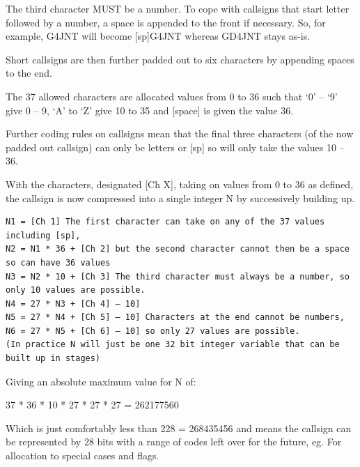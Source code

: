 The third character MUST be a number. To cope with callsigns that start
letter followed by a number, a space is appended to the front if
necessary. So, for example, G4JNT will become {[}sp{]}G4JNT whereas
GD4JNT stays as-is.

Short callsigns are then further padded out to six characters by
appending spaces to the end.

The 37 allowed characters are allocated values from 0 to 36 such that
`0' -- `9' give 0 -- 9, `A' to `Z' give 10 to 35 and {[}space{]} is
given the value 36.

Further coding rules on callsigns mean that the final three characters
(of the now padded out callsign) can only be letters or {[}sp{]} so will
only take the values 10 -- 36.

With the characters, designated {[}Ch X{]}, taking on values from 0 to
36 as defined, the callsign is now compressed into a single integer N by
successively building up.

\begin{lstlisting}
N1 = [Ch 1] The first character can take on any of the 37 values including [sp],
N2 = N1 * 36 + [Ch 2] but the second character cannot then be a space so can have 36 values
N3 = N2 * 10 + [Ch 3] The third character must always be a number, so only 10 values are possible.
N4 = 27 * N3 + [Ch 4] – 10]
N5 = 27 * N4 + [Ch 5] – 10] Characters at the end cannot be numbers,
N6 = 27 * N5 + [Ch 6] – 10] so only 27 values are possible.
(In practice N will just be one 32 bit integer variable that can be built up in stages)
\end{lstlisting}

Giving an absolute maximum value for N of:

37 * 36 * 10 * 27 * 27 * 27 = 262177560

Which is just comfortably less than 228 = 268435456 and means the
callsign can be represented by 28 bits with a range of codes left over
for the future, eg. For allocation to special cases and flags.

